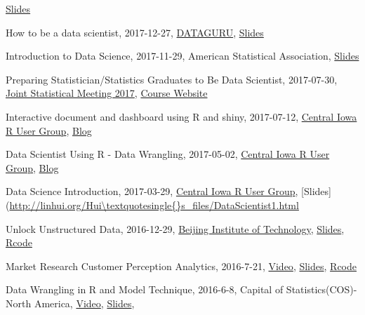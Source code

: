 \documentclass[11pt,]{article}
\renewenvironment{itemize}{
  \begin{list}{}{
    \setlength{\leftmargin}{1.5em}
  }
}{
  \end{list}
}
\begin{document}
\begin{itemize}
  \href{http://scientistcafe.com/IDS/slides/MarketingDataScience.html}{Slides}
\item
  How to be a data scientist, 2017-12-27,
  \href{http://club.dataguru.cn/activity-view-27.html}{DATAGURU},
  \href{https://github.com/happyrabbit/Talks/tree/master/DATAGURU2017_12_27}{Slides}
\item
  Introduction to Data Science, 2017-11-29, American Statistical
  Association,
  \href{https://github.com/happyrabbit/Talks/tree/master/ASA_SSPA2017_11_29}{Slides}
\item
  Preparing Statistician/Statistics Graduates to Be Data Scientist,
  2017-07-30,
  \href{https://ww2.amstat.org/meetings/jsm/2017/onlineprogram/ActivityDetails.cfm?SessionID=214069}{Joint
  Statistical Meeting 2017},
  \href{https://github.com/happyrabbit/CE_JSM2017}{Course Website}
\item
  Interactive document and dashboard using R and shiny, 2017-07-12,
  \href{http://www.meetup.com/Central-Iowa-R-User-Group/}{Central Iowa R
  User Group},
  \href{http://scientistcafe.com/post/MarkdownReport.html}{Blog}
\item
  Data Scientist Using R - Data Wrangling, 2017-05-02,
  \href{http://www.meetup.com/Central-Iowa-R-User-Group/}{Central Iowa R
  User Group},
  \href{http://scientistcafe.com/2017/04/30/DataWrangling.html}{Blog}
\item
  Data Science Introduction, 2017-03-29,
  \href{http://www.meetup.com/Central-Iowa-R-User-Group/}{Central Iowa R
  User Group},
  {[}Slides{]}(\url{http://linhui.org/Hui\textquotesingle{}s_files/DataScientist1.html}
\item
  Unlock Unstructured Data, 2016-12-29,
  \href{https://en.wikipedia.org/wiki/Beijing_Institute_of_Technology}{Beijing
  Institute of Technology},
  \href{http://hui1987.com/Presentations/UnlockUnstrDataMkt.html}{Slides},
  \href{https://github.com/happyrabbit/BTI2016_12_29/tree/master/Rcode}{Rcode}
\item
  Market Research Customer Perception Analytics, 2016-7-21,
  \href{https://youtu.be/joajST7JByo}{Video},
  \href{http://hui1987.com/Presentations/AirlineSurvey_XueQing/AirlineSurveyPerception.html\#(1)}{Slides},
  \href{http://hui1987.com/Presentations/AirlineSurvey_XueQing/Rcode.R}{Rcode}
\item
  Data Wrangling in R and Model Technique, 2016-6-8, Capital of
  Statistics(COS)-North America,
  \href{https://www.youtube.com/watch?v=fsHgJhOYOTM}{Video},
  \href{http://hui1987.com/Presentations/COS_NA2016-6-8/Presentation_2016_6_8.html}{Slides},

\end{itemize}
\end{document}
